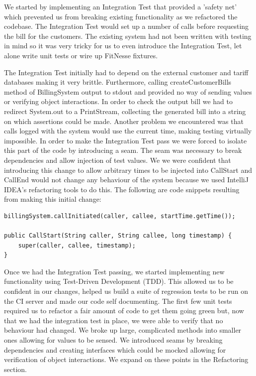 \documentclass[a4paper,11pt]{article}
\begin{document}
We started by implementing an Integration Test that provided a 'safety net' which prevented us from breaking existing functionality as we refactored the codebase. The Integration Test would set up a number of calls before requesting the bill for the customers. The existing system had not been written with testing in mind so it was very tricky for us to even introduce the Integration Test, let alone write unit tests or wire up FitNesse fixtures. 

The Integration Test initially had to depend on the external customer and tariff databases making it very brittle. Furthermore, calling createCustomerBills method of BillingSystem output to stdout and provided no way of sending values or verifying object interactions. In order to check the output bill we had to redirect System.out to a PrintStream, collecting the generated bill into a string on which assertions could be made. Another problem we encountered was that calls logged with the system would use the current time, making testing virtually impossible. In order to make the Integration Test pass we were forced to isolate this part of the code by introducing a seam. The seam was necessary to break dependencies and allow injection of test values. We we were confident that introducing this change to allow arbitrary times to be injected into CallStart and CallEnd would not change any behaviour of the system because we used IntelliJ IDEA's refactoring tools to do this. The following are code snippets resulting from making this initial change:

\begin{lstlisting}
billingSystem.callInitiated(caller, callee, startTime.getTime());

public CallStart(String caller, String callee, long timestamp) {
    super(caller, callee, timestamp);
}
\end{lstlisting}

Once we had the Integration Test passing, we started implementing new functionality using Test-Driven Development (TDD).  This allowed us to be confident in our changes, helped us build a suite of regression tests to be run on the CI server and made our code self documenting. The first few unit tests required us to refactor a fair amount of code to get them going green but, now that we had the integration test in place, we were able to verify that no behaviour had changed. We broke up large, complicated methods into smaller ones allowing for values to be sensed. We introduced seams by breaking dependencies and creating interfaces which could be mocked allowing for verification of object interactions. We expand on these points in the Refactoring section.
\end{document}
